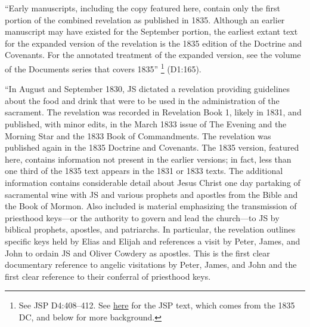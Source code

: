 			``Early manuscripts, including the copy featured here, contain only the first portion of the combined revelation as published in 1835. Although an earlier manuscript may have existed for the September portion, the earliest extant text for the expanded version of the revelation is the 1835 edition of the Doctrine and Covenants. For the annotated treatment of the expanded version, see the volume of the Documents series that covers 1835''%
				\footnote{%
					See JSP D4:408--412. See \hyperref[EMS-1835-JS-CIR-AUG-1835]{here} for the JSP text, which comes from the 1835 DC, and below for more background.
					} 
			(D1:165).
			
			``In August and September 1830, JS dictated a revelation providing guidelines about the food and drink that were to be used in the administration of the sacrament. The revelation was recorded in Revelation Book 1, likely in 1831, and published, with minor edits, in the March 1833 issue of The Evening and the Morning Star and the 1833 Book of Commandments. The revelation was published again in the 1835 Doctrine and Covenants. The 1835 version, featured here, contains information not present in the earlier versions; in fact, less than one third of the 1835 text appears in the 1831 or 1833 texts. The additional information contains considerable detail about Jesus Christ one day partaking of sacramental wine with JS and various prophets and apostles from the Bible and the Book of Mormon. Also included is material emphasizing the transmission of priesthood keys---or the authority to govern and lead the church---to JS by biblical prophets, apostles, and patriarchs. In particular, the revelation outlines specific keys held by Elias and Elijah and references a visit by Peter, James, and John to ordain JS and Oliver Cowdery as apostles. This is the first clear documentary reference to angelic visitations by Peter, James, and John and the first clear reference to their conferral of priesthood keys.%
